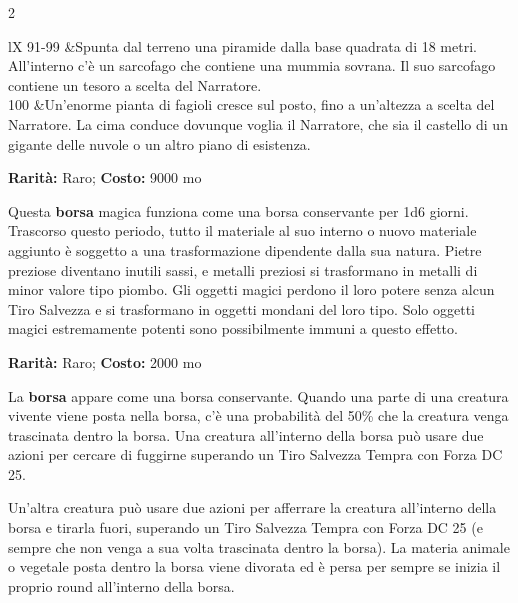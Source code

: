 \begin{multicols}{2}
\begin{multicoltab}{lX}
91-99 &Spunta dal terreno una piramide dalla base quadrata di 18 metri. All'interno c'è un sarcofago che contiene una mummia sovrana. Il suo sarcofago contiene un tesoro a scelta del Narratore.\\
100 &Un'enorme pianta di fagioli cresce sul posto, fino a un'altezza a scelta del Narratore. La cima conduce dovunque voglia il Narratore, che sia il castello di un gigante delle nuvole o un altro piano di esistenza.\\
\end{multicoltab}
%


\medskip


\textbf{Rarità:} Raro; \textbf{Costo:} 9000 mo

Questa \textbf{borsa} magica funziona come una borsa conservante per 1d6 giorni. Trascorso questo periodo, tutto il materiale al suo interno o nuovo materiale aggiunto è soggetto a una trasformazione dipendente dalla sua natura. Pietre preziose diventano inutili sassi, e metalli preziosi si trasformano in metalli di minor valore tipo piombo. Gli oggetti magici perdono il loro potere senza alcun Tiro Salvezza e si trasformano in oggetti mondani del loro tipo. Solo oggetti magici estremamente potenti sono possibilmente immuni a questo effetto.


\textbf{Rarità:} Raro; \textbf{Costo:} 2000 mo

La \textbf{borsa} appare come una borsa conservante. Quando una parte di una creatura vivente viene posta nella borsa, c'è una probabilità del 50\% che la creatura venga trascinata dentro la borsa. Una creatura all'interno della borsa può usare due azioni per cercare di fuggirne superando un Tiro Salvezza Tempra con Forza DC 25.

Un'altra creatura può usare due azioni per afferrare la creatura all'interno della borsa e tirarla fuori, superando un Tiro Salvezza Tempra con Forza DC 25 (e sempre che non venga a sua volta trascinata dentro la borsa). La materia animale o vegetale posta dentro la borsa viene divorata ed è persa per sempre se inizia il proprio round all'interno della borsa.


\end{multicols}
